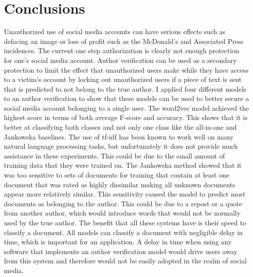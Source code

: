 \documentclass[11pt]{article}
\begin{document}
\section{Conclusions\label{sec:conclusions}}
Unauthorized use of social media accounts can have serious effects such as defacing an image or loss of profit such as the McDonald's and Associated Press incidences. The current one step authorization is clearly not enough protection for one's social media account. Author verification can be used as a secondary protection to limit the effect that unauthorized users make while they have access to a victim's account by locking out unauthorized users if a piece of text is sent that is predicted to not belong to the true author. I applied four different models to an author verification to show that these models can be used to better secure a social media account belonging to a single user. The word2vec model achieved the highest score in terms of both average F-score and accuracy. This shows that it is better at classifying both classes and not only one class like the all-in-one and Jankowska baselines. The use of tf-idf has been known to work well on many natural language processing tasks, but unfortunately it does not provide much assistance in these experiments. This could be due to the small amount of training data that they were trained on. The Jankowska method showed that it was too sensitive to sets of documents for training that contain at least one document that was rated as highly dissimilar making all unknown documents appear more relatively similar. This sensitivity caused the model to predict most documents as belonging to the author. This could be due to a repost or a quote from another author, which would introduce words that would not be normally used by the true author. The benefit that all these systems have is their speed to classify a document. All models can classify a document with negligible delay in time, which is important for an application. A delay in time when using any software that implements an author verification model would drive users away from this system and therefore would not be easily adopted in the realm of social media. 
\end{document}
